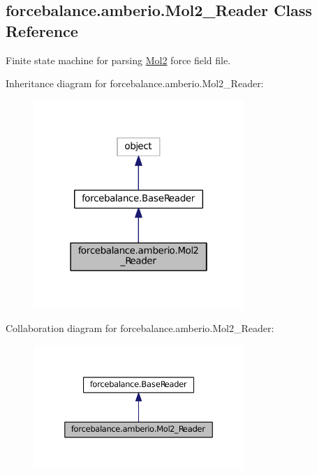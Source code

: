 \hypertarget{classforcebalance_1_1amberio_1_1Mol2__Reader}{\subsection{forcebalance.\-amberio.\-Mol2\-\_\-\-Reader Class Reference}
\label{classforcebalance_1_1amberio_1_1Mol2__Reader}
}


Finite state machine for parsing \hyperlink{namespaceforcebalance_1_1Mol2}{Mol2} force field file.  




Inheritance diagram for forcebalance.\-amberio.\-Mol2\-\_\-\-Reader\-:
\nopagebreak
\begin{figure}[H]
\begin{center}
\leavevmode
\includegraphics[width=226pt]{classforcebalance_1_1amberio_1_1Mol2__Reader__inherit__graph}
\end{center}
\end{figure}


Collaboration diagram for forcebalance.\-amberio.\-Mol2\-\_\-\-Reader\-:
\nopagebreak
\begin{figure}[H]
\begin{center}
\leavevmode
\includegraphics[width=226pt]{classforcebalance_1_1amberio_1_1Mol2__Reader__coll__graph}
\end{center}
\end{figure}
